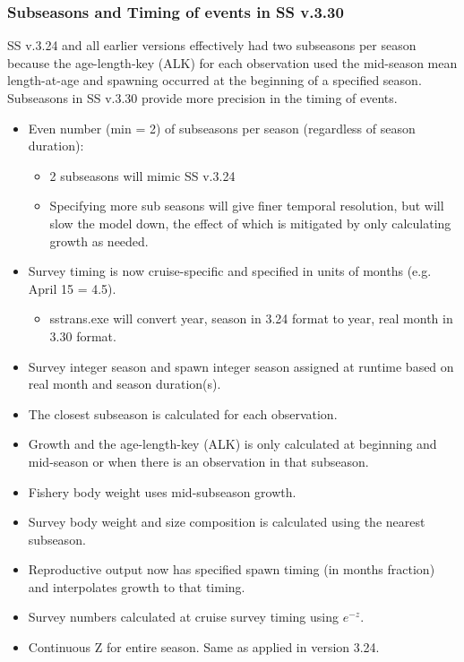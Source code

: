 \subsubsection{Subseasons and Timing of events in SS v.3.30}
\hypertarget{SubSeas}{}
SS v.3.24 and all earlier versions effectively had two subseasons per season because the age-length-key (ALK) for each observation used the mid-season mean length-at-age and spawning occurred at the beginning of a specified season.  Subseasons in SS v.3.30 provide more precision in the timing of events.

	\begin{itemize}
		\item Even number (min = 2) of subseasons per season (regardless of season duration):
			\begin{itemize}
				\item 2 subseasons will mimic SS v.3.24
				\item Specifying more sub seasons will give finer temporal resolution, but will slow the model down, the effect of which is mitigated by only calculating growth as needed.
			\end{itemize}
		\item Survey timing is now cruise-specific and specified in units of months (e.g. April 15 = 4.5).
			\begin{itemize}
				\item sstrans.exe will convert year, season in 3.24 format to year, real month in 3.30 format.
			\end{itemize}
		\item Survey integer season and spawn integer season assigned at runtime based on real month and season duration(s).
		\item The closest subseason is calculated for each observation.
		\item Growth and the age-length-key (ALK) is only calculated at beginning and mid-season or when there is an observation in that subseason.
		\item Fishery body weight uses mid-subseason growth.
		\item Survey body weight and size composition is calculated using the nearest subseason.
		\item Reproductive output now has specified spawn timing (in months fraction) and interpolates growth to that timing.
		\item Survey numbers calculated at cruise survey timing using $e^{-z}$.
		\item Continuous Z for entire season.  Same as applied in version 3.24.
	\end{itemize}

